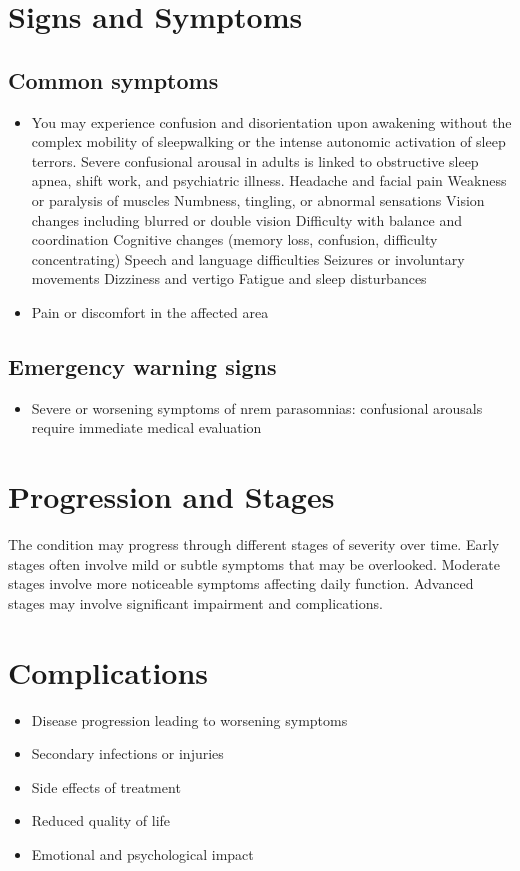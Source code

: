 \section{Signs and Symptoms}
\subsection{Common symptoms}
\begin{itemize}[noitemsep]
  \item You may experience confusion and disorientation upon awakening without the complex mobility of sleepwalking or the intense autonomic activation of sleep terrors. Severe confusional arousal in adults is linked to obstructive sleep apnea, shift work, and psychiatric illness. Headache and facial pain Weakness or paralysis of muscles Numbness, tingling, or abnormal sensations Vision changes including blurred or double vision Difficulty with balance and coordination Cognitive changes (memory loss, confusion, difficulty concentrating) Speech and language difficulties Seizures or involuntary movements Dizziness and vertigo Fatigue and sleep disturbances
  \item Pain or discomfort in the affected area
  \end{itemize}
\subsection{Emergency warning signs}
\begin{itemize}[noitemsep]
  \item Severe or worsening symptoms of nrem parasomnias: confusional arousals require immediate medical evaluation
\end{itemize}
\section{Progression and Stages}
The condition may progress through different stages of severity over time. Early stages often involve mild or subtle symptoms that may be overlooked. Moderate stages involve more noticeable symptoms affecting daily function. Advanced stages may involve significant impairment and complications.
\section{Complications}
\begin{itemize}[noitemsep]
  \item Disease progression leading to worsening symptoms
  \item Secondary infections or injuries
  \item Side effects of treatment
  \item Reduced quality of life
  \item Emotional and psychological impact
\end{itemize}
